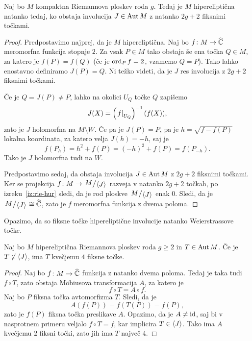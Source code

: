 \begin{trditev}
Naj bo $M$ kompaktna Riemannova ploskev roda $g$. Tedaj je $M$
hipereliptična natanko tedaj, ko obstaja involucija $J \in \operatorname{Aut} M$
z natanko $2g + 2$ fiksnimi točkami.
\end{trditev}

\begin{proof}
Predpostavimo najprej, da je $M$ hipereliptična. Naj bo
$f \colon M \to \widehat{\mathbb{C}}$ meromorfna funkcija stopnje $2$. Za vsak
$P \in M$ tako obstaja še ena točka $Q \in M$, za katero je
$f(P) = f(Q)$ (če je $\operatorname{ord}_P f = 2$, vzamemo $Q=P$). Tako lahko
enostavno definiramo $J(P) = Q$. Ni težko videti, da je $J$
res involucija z $2g + 2$ fiksnimi točkami.

Če je $Q = J(P) \ne P$, lahko na okolici $U_Q$ točke $Q$ zapišemo
\[
J(X) = \left(\left. f\right|_{U_Q}^{}\right)^{-1}(f(X)),
\]
zato je $J$ holomorfna na $M \setminus W$. Če pa je $J(P) = P$, pa
je $h = \sqrt{f - f(P)}$ lokalna koordinata, za katero velja
$J(h) = -h$, saj je
\[
f(P_h) = h^2 + f(P) = (-h)^2 + f(P) = f(P_{-h}).
\]
Tako je $J$ holomorfna tudi na $W$.

Predpostavimo sedaj, da obstaja involucija $J \in \operatorname{Aut} M$ z
$2g + 2$ fiksnimi točkami. Ker se projekcija
$f \colon M \to \kvoc{M}{\skl{J}}$ razveja v natanko $2g + 2$
točkah, po izreku~\ref{iz:rie-hur} sledi, da je rod ploskve
$\kvoc{M}{\skl{J}}$ enak $0$. Sledi, da je
$\kvoc{M}{\skl{J}} \cong \rs$, zato je $f$ meromorfna funkcija z
dvema poloma.
\end{proof}

Opazimo, da so fiksne točke hipereliptične involucije natanko
Weierstrassove točke.

\begin{trditev}
Naj bo $M$ hipereliptična Riemannova ploskev roda $g \geq 2$ in
$T \in \operatorname{Aut} M$. Če je $T \not \in \left\langle J\right\rangle$, ima $T$ kvečjemu $4$
fiksne točke.
\end{trditev}

\begin{proof}
Naj bo $f \colon M \to \widehat{\mathbb{C}}$ funkcija z natanko dvema poloma. Tedaj
je taka tudi $f \circ T$, zato obstaja Möbiusova transformacija
$A$, za katero je
\[
f \circ T = A \circ f.
\]
Naj bo $P$ fiksna točka avtomorfizma $T$. Sledi, da je
\[
A(f(P)) = f(T(P)) = f(P),
\]
zato je $f(P)$ fiksna točka preslikave $A$. Opazimo, da je
$A \ne \operatorname{id}$, saj bi v nasprotnem primeru veljalo $f \circ T = f$,
kar implicira $T \in \left\langle J\right\rangle$. Tako ima $A$ kvečjemu $2$ fiksni
točki, zato jih ima $T$ največ $4$.
\end{proof}
